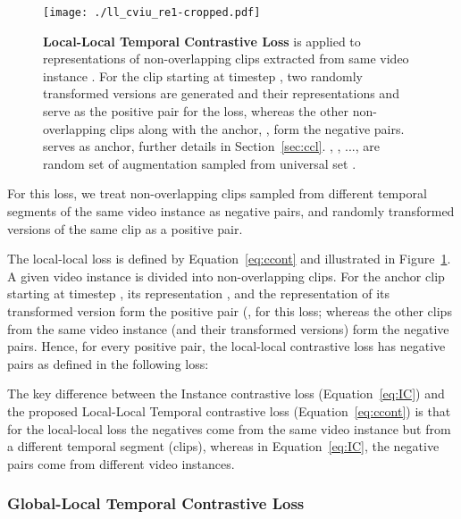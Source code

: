 \documentclass[10pt,twocolumn,letterpaper]{article}
\begin{document}
\begin{figure}[t]
\centering
    \texttt{[image: ./ll\_cviu\_re1-cropped.pdf]}
    \vspace{-2mm}
  \caption{\textbf{Local-Local Temporal Contrastive Loss} is applied to representations of non-overlapping clips extracted from same video instance . For the clip starting at timestep , two randomly transformed versions are generated and their representations  and  serve as the positive pair for the loss, whereas the other non-overlapping clips along with the anchor, , form the negative pairs.  serves as anchor, further details in Section~\ref{sec:ccl}. , , ...,  are random set of augmentation sampled from universal set .}
\label{fig:tcw}
\end{figure}

For this loss, we treat non-overlapping clips sampled from different temporal segments of the same video instance as negative pairs, and randomly transformed versions of the same clip as a positive pair.   

The local-local loss is defined by Equation~\ref{eq:ccont} and illustrated in Figure~\ref{fig:tcw}. A given video instance  is divided into  non-overlapping clips. For the anchor clip starting at timestep , its representation , and the representation of its transformed version form the positive pair (, for this loss; whereas the other  clips from the same video instance (and their transformed versions) form the negative pairs. Hence, for every positive pair, the local-local contrastive loss has  negative pairs as defined in the following loss: 




The key difference between the Instance contrastive loss (Equation~\ref{eq:IC}) and the proposed Local-Local Temporal contrastive loss (Equation~\ref{eq:ccont}) is that for the local-local loss the negatives come from the same video instance but from a different temporal segment (clips), whereas in Equation~\ref{eq:IC}, the negative pairs come from different video instances.

\subsubsection{Global-Local Temporal Contrastive Loss}
\label{sec:pcl}
\end{document}
